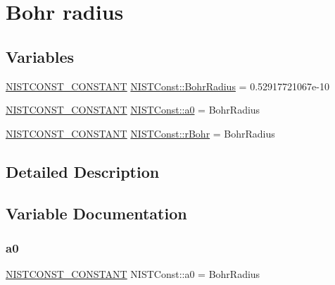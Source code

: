 \hypertarget{group___n_i_s_t_const-_bohr_radius}{}\section{Bohr radius}
\label{group___n_i_s_t_const-_bohr_radius}
\subsection*{Variables}
\begin{DoxyCompactItemize}
\item 
\mbox{\hyperlink{group___n_i_s_t_const-_macros_ga2b0fc1d7452373f816175dd86ce26729}{N\+I\+S\+T\+C\+O\+N\+S\+T\+\_\+\+C\+O\+N\+S\+T\+A\+NT}} \mbox{\hyperlink{group___n_i_s_t_const-_bohr_radius_ga9a18bd8c20d78ff8ad8747cdd623a07b}{N\+I\+S\+T\+Const\+::\+Bohr\+Radius}} = 0.\+52917721067e-\/10
\item 
\mbox{\hyperlink{group___n_i_s_t_const-_macros_ga2b0fc1d7452373f816175dd86ce26729}{N\+I\+S\+T\+C\+O\+N\+S\+T\+\_\+\+C\+O\+N\+S\+T\+A\+NT}} \mbox{\hyperlink{group___n_i_s_t_const-_bohr_radius_ga08408fd7e952f2541e40e1f5a32a76e6}{N\+I\+S\+T\+Const\+::a0}} = Bohr\+Radius
\item 
\mbox{\hyperlink{group___n_i_s_t_const-_macros_ga2b0fc1d7452373f816175dd86ce26729}{N\+I\+S\+T\+C\+O\+N\+S\+T\+\_\+\+C\+O\+N\+S\+T\+A\+NT}} \mbox{\hyperlink{group___n_i_s_t_const-_bohr_radius_ga49c016a62c072bfa4f02c47b84743a3d}{N\+I\+S\+T\+Const\+::r\+Bohr}} = Bohr\+Radius
\end{DoxyCompactItemize}


\subsection{Detailed Description}


\subsection{Variable Documentation}
\mbox{\label{group___n_i_s_t_const-_bohr_radius_ga08408fd7e952f2541e40e1f5a32a76e6}} 
\subsubsection{\texorpdfstring{a0}{a0}}
{\footnotesize\ttfamily \mbox{\hyperlink{group___n_i_s_t_const-_macros_ga2b0fc1d7452373f816175dd86ce26729}{N\+I\+S\+T\+C\+O\+N\+S\+T\+\_\+\+C\+O\+N\+S\+T\+A\+NT}} N\+I\+S\+T\+Const\+::a0 = Bohr\+Radius}

